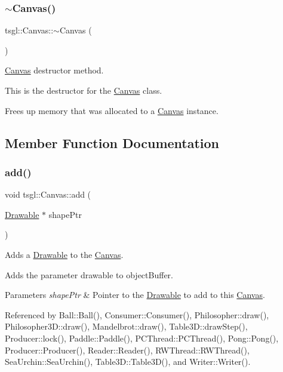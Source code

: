 \subsubsection{\texorpdfstring{$\sim$\+Canvas()}{~Canvas()}}
{\footnotesize\ttfamily tsgl\+::\+Canvas\+::$\sim$\+Canvas (\begin{DoxyParamCaption}{ }\end{DoxyParamCaption})\hspace{0.3cm}{\ttfamily [virtual]}}



\hyperlink{classtsgl_1_1_canvas}{Canvas} destructor method. 

This is the destructor for the \hyperlink{classtsgl_1_1_canvas}{Canvas} class.

Frees up memory that was allocated to a \hyperlink{classtsgl_1_1_canvas}{Canvas} instance. 

\subsection{Member Function Documentation}
\mbox{\label{classtsgl_1_1_canvas_ab8bc6862497ae8c93c03185e96c0ae9a}} 
\subsubsection{\texorpdfstring{add()}{add()}}
{\footnotesize\ttfamily void tsgl\+::\+Canvas\+::add (\begin{DoxyParamCaption}\item[{\hyperlink{classtsgl_1_1_drawable}{Drawable} $\ast$}]{shape\+Ptr }\end{DoxyParamCaption})}



Adds a \hyperlink{classtsgl_1_1_drawable}{Drawable} to the \hyperlink{classtsgl_1_1_canvas}{Canvas}. 

Adds the parameter drawable to object\+Buffer. 
\begin{DoxyParams}{Parameters}
{\em shape\+Ptr} & Pointer to the \hyperlink{classtsgl_1_1_drawable}{Drawable} to add to this \hyperlink{classtsgl_1_1_canvas}{Canvas}. \\
\hline
\end{DoxyParams}


Referenced by Ball\+::\+Ball(), Consumer\+::\+Consumer(), Philosopher\+::draw(), Philosopher3\+D\+::draw(), Mandelbrot\+::draw(), Table3\+D\+::draw\+Step(), Producer\+::lock(), Paddle\+::\+Paddle(), P\+C\+Thread\+::\+P\+C\+Thread(), Pong\+::\+Pong(), Producer\+::\+Producer(), Reader\+::\+Reader(), R\+W\+Thread\+::\+R\+W\+Thread(), Sea\+Urchin\+::\+Sea\+Urchin(), Table3\+D\+::\+Table3\+D(), and Writer\+::\+Writer().


